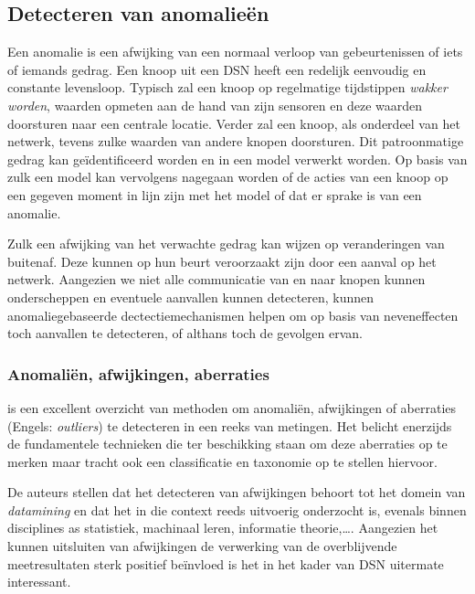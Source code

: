 
\subsection{Detecteren van anomalie\"en}
\label{subsection:anomaly}

Een anomalie is een afwijking van een normaal verloop van gebeurtenissen of
iets of iemands gedrag. Een knoop uit een DSN heeft een redelijk eenvoudig en
constante levensloop. Typisch zal een knoop op regelmatige tijdstippen
\emph{wakker worden}, waarden opmeten aan de hand van zijn sensoren en deze
waarden doorsturen naar een centrale locatie. Verder zal een knoop, als
onderdeel van het netwerk, tevens zulke waarden van andere knopen doorsturen.
Dit patroonmatige gedrag kan ge\"identificeerd worden en in een model verwerkt
worden. Op basis van zulk een model kan vervolgens nagegaan worden of de acties
van een knoop op een gegeven moment in lijn zijn met het model of dat er sprake
is van een anomalie.

Zulk een afwijking van het verwachte gedrag kan wijzen op veranderingen van
buitenaf. Deze kunnen op hun beurt veroorzaakt zijn door een aanval op het
netwerk. Aangezien we niet alle communicatie van en naar knopen kunnen
onderscheppen en eventuele aanvallen kunnen detecteren, kunnen
anomaliegebaseerde dectectiemechanismen helpen om op basis van neveneffecten
toch aanvallen te detecteren, of althans toch de gevolgen ervan.

\subsubsection*{Anomali\"en, afwijkingen, aberraties}
\label{subsubsection:outlier}

\cite{zhang2010outlier} is een excellent overzicht van methoden om anomali\"en,
afwijkingen of aberraties (Engels: \emph{outliers}) te detecteren in een reeks
van metingen. Het belicht enerzijds de fundamentele technieken die ter
beschikking staan om deze aberraties op te merken maar tracht ook een
classificatie en taxonomie op te stellen hiervoor.

De auteurs stellen dat het detecteren van afwijkingen behoort tot het domein
van \emph{datamining} en dat het in die context reeds uitvoerig onderzocht is,
evenals binnen disciplines as statistiek, machinaal leren, informatie
theorie,\dots. Aangezien het kunnen uitsluiten van afwijkingen de verwerking
van de overblijvende meetresultaten sterk positief be\"invloed is het in het
kader van DSN uitermate interessant.

